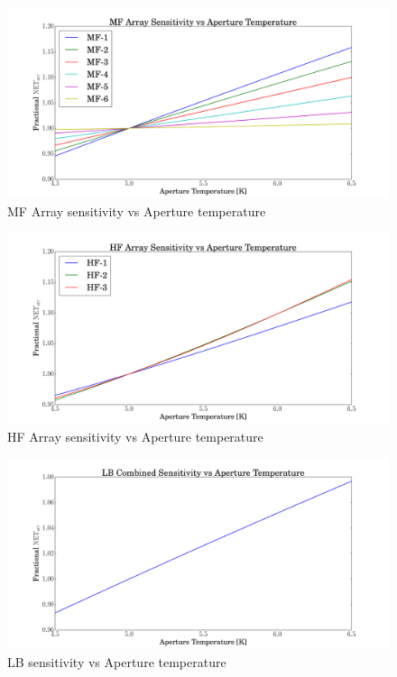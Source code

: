 \documentclass[12pt, titlepage]{article} %
\begin{document}
\begin{figure}[H]
	\centering
	\includegraphics[width=1.1\textwidth, center]{PDF/TempDependence_Aperture_MF.pdf}
	\caption{MF Array sensitivity vs Aperture temperature}
\end{figure}
	
\begin{figure}[H]
	\centering
	\includegraphics[width=1.1\textwidth, center]{PDF/TempDependence_Aperture_HF.pdf}
	\caption{HF Array sensitivity vs Aperture temperature}
\end{figure}

\begin{figure}[H]
	\centering
	\includegraphics[width=1.1\textwidth, center]{PDF/TempDependence_Aperture_LB.pdf}
	\caption{LB sensitivity vs Aperture temperature}
\end{figure}
\end{document}
